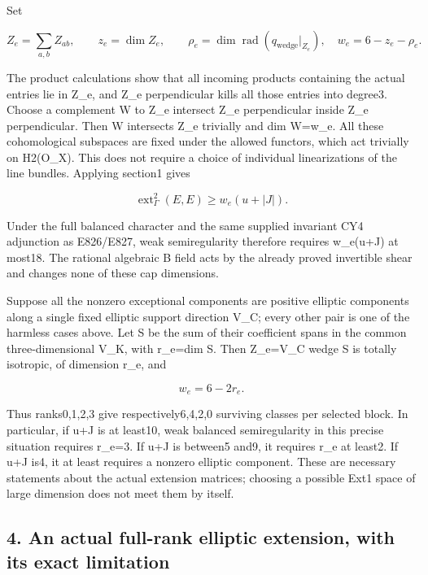 Set

\[
 Z_e=\sum_{a,b}Z_{ab},\qquad z_e=\dim Z_e,\qquad
 \rho_e=\dim\operatorname{rad}(q_{\mathrm{wedge}}|_{Z_e}),
 \quad w_e=6-z_e-\rho_e.
 \tag{E830.8}
\]

The product calculations show that all incoming products containing the
actual entries lie in Z\_e, and Z\_e perpendicular kills all those entries
into degree3. Choose a complement W to Z\_e intersect Z\_e perpendicular
inside Z\_e perpendicular. Then W intersects Z\_e trivially and dim W=w\_e.
All these cohomological subspaces are fixed under the allowed functors,
which act trivially on H2(O\_X). This does not require a choice of
individual linearizations of the line bundles. Applying section1 gives

\[
 \operatorname{ext}^2_\Gamma(E,E)\ge w_e(u+|J|).
 \tag{E830.9}
\]

Under the full balanced character and the same supplied invariant CY4
adjunction as E826/E827, weak semiregularity therefore requires
w\_e(u+\textbar J\textbar) at most18. The rational algebraic B field acts by
the already proved invertible shear and changes none of these cap
dimensions.

Suppose all the nonzero exceptional components are positive elliptic
components along a single fixed elliptic support direction V\_C; every other
pair is one of the harmless cases above. Let S be the sum of their
coefficient spans in the common three-dimensional V\_K, with r\_e=dim S.
Then Z\_e=V\_C wedge S is totally isotropic, of dimension r\_e, and

\[
 w_e=6-2r_e.
 \tag{E830.10}
\]

Thus ranks0,1,2,3 give respectively6,4,2,0 surviving classes per selected
block. In particular, if u+\textbar J\textbar{} is at least10, weak balanced
semiregularity in this precise situation requires r\_e=3. If
u+\textbar J\textbar{} is between5 and9, it requires r\_e at least2. If
u+\textbar J\textbar{} is4, it at least requires a nonzero elliptic
component. These are necessary statements about the actual extension
matrices; choosing a possible Ext1 space of large dimension does not meet
them by itself.

\subsection{4. An actual full-rank elliptic extension, with its exact
limitation}\label{SF-E830:an-actual-full-rank-elliptic-extension-with-its-exact-limitation}

